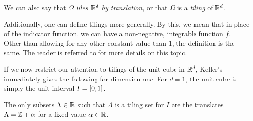 \documentclass[../thesis.tex]{subfiles}
\begin{document}
\begin{remark}
    We can also say that $\Omega$ \emph{tiles $\mathbb{R}^d$ by translation}, or that $\Omega$ is a \emph{tiling} of $\mathbb{R}^d$. 
\end{remark}
\begin{remark}
    Additionally, one can define tilings more generally. By this, we mean that in place of the indicator function, we can have a non-negative, integrable function $f$. Other than allowing for any other constant value than $1$, the definition is the same. The reader is referred to \cite{kolountzakisTilingsTranslation2010,kolountzakisStructureTilingsLine1996} for more details on this topic.
\end{remark}
If we now restrict our attention to tilings of the unit cube in $\mathbb{R}^d$, Keller's  immediately gives the following for dimension one.  For $d=1$, the unit cube is simply the unit interval $I = [0,1]$. %

\begin{lemma}\label{lem:tiling_unit_1d}
    The only subsets $\Lambda \in \mathbb{R}$ such that $\Lambda$ is a tiling set for $I$ are the translates $\Lambda = \mathbb{Z} +\alpha$ for a fixed value $\alpha\in \mathbb{R}$. 
\end{lemma}
\end{document}
